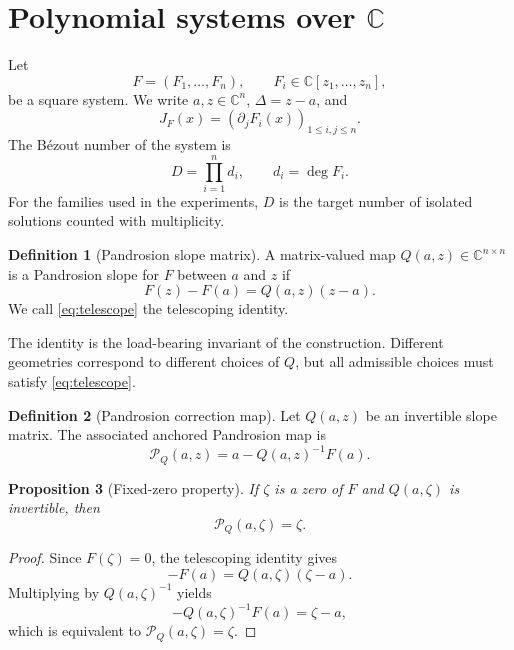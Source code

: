 \documentclass[11pt,a4paper]{article}
\theoremstyle{definition}
\newtheorem{definition}{Definition}[section]
\theoremstyle{plain}
\newtheorem{proposition}[definition]{Proposition}
\theoremstyle{remark}
\newcommand{\C}{\mathbb C}
\begin{document}
\section{Polynomial systems over \texorpdfstring{\(\C\)}{C}}

Let
\[
  F=(F_1,\ldots,F_n),\qquad F_i\in\C[z_1,\ldots,z_n],
\]
be a square system.  We write \(a,z\in\C^n\), \(\Delta=z-a\), and
\[
  J_F(x)=\left(\partial_jF_i(x)\right)_{1\le i,j\le n}.
\]
The B\'ezout number of the system is
\[
  D=\prod_{i=1}^n d_i,\qquad d_i=\deg F_i.
\]
For the families used in the experiments, \(D\) is the target number of isolated
solutions counted with multiplicity.

\begin{definition}[Pandrosion slope matrix]
A matrix-valued map \(Q(a,z)\in\C^{n\times n}\) is a Pandrosion slope for
\(F\) between \(a\) and \(z\) if
\begin{equation}
  \label{eq:telescope}
  F(z)-F(a)=Q(a,z)(z-a).
\end{equation}
We call \eqref{eq:telescope} the telescoping identity.
\end{definition}

The identity is the load-bearing invariant of the construction.  Different
geometries correspond to different choices of \(Q\), but all admissible choices
must satisfy \eqref{eq:telescope}.

\begin{definition}[Pandrosion correction map]
Let \(Q(a,z)\) be an invertible slope matrix.  The associated anchored
Pandrosion map is
\begin{equation}
  \label{eq:pandrosion-map}
  \mathcal P_Q(a,z)
  =
  a-Q(a,z)^{-1}F(a).
\end{equation}
\end{definition}

\begin{proposition}[Fixed-zero property]
\label{prop:fixed-zero}
If \(\zeta\) is a zero of \(F\) and \(Q(a,\zeta)\) is invertible, then
\[
  \mathcal P_Q(a,\zeta)=\zeta.
\]
\end{proposition}

\begin{proof}
Since \(F(\zeta)=0\), the telescoping identity gives
\[
  -F(a)=Q(a,\zeta)(\zeta-a).
\]
Multiplying by \(Q(a,\zeta)^{-1}\) yields
\[
  -Q(a,\zeta)^{-1}F(a)=\zeta-a,
\]
which is equivalent to \(\mathcal P_Q(a,\zeta)=\zeta\).
\end{proof}
\end{document}
